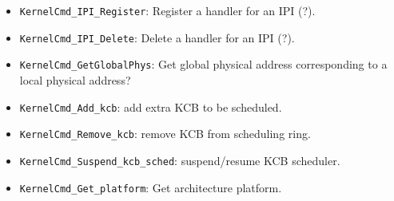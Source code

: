 \begin{itemize}
  \item \verb|KernelCmd_IPI_Register|: Register a handler for an IPI (?).
  \item \verb|KernelCmd_IPI_Delete|: Delete a handler for an IPI (?).
  \item \verb|KernelCmd_GetGlobalPhys|: Get global physical address
    corresponding to a local physical address?
  \item \verb|KernelCmd_Add_kcb|: add extra KCB to be scheduled.
  \item \verb|KernelCmd_Remove_kcb|: remove KCB from scheduling ring.
  \item \verb|KernelCmd_Suspend_kcb_sched|: suspend/resume KCB scheduler.
  \item \verb|KernelCmd_Get_platform|: Get architecture platform.
\end{itemize}

